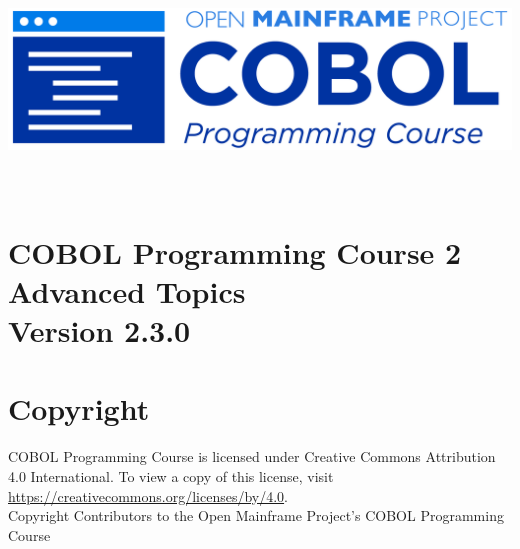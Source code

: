 \begin{center}
  \vspace*{25pt}
\includegraphics{Images/COBOL-Programming-Course.png}
\hypertarget{cobol-programming-course-2}{%
\section*{
  \\[35pt]
  \Huge COBOL Programming Course 2 \\[10pt]
  \Huge Advanced Topics \\[15pt]
  \Large Version 2.3.0}\label{cobol-programming-course-2}}
\end{center}

\pagebreak
\hypertarget{copyright}{%
\section*{Copyright}{
  \normalsize COBOL Programming Course is licensed under Creative Commons 
  Attribution 4.0 International. To view a copy of this license, visit 
  \href{https://creativecommons.org/licenses/by/4.0}{https://creativecommons.org/licenses/by/4.0}. \\[10pt]
  Copyright Contributors to the Open Mainframe Project's COBOL Programming Course}\label{copyright}}
\pagebreak